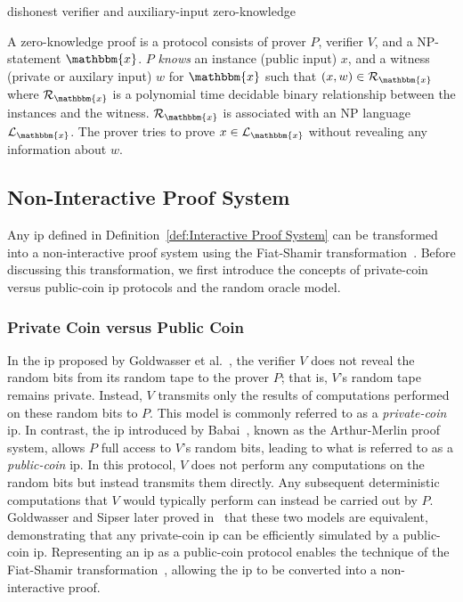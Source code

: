 dishonest verifier and auxiliary-input zero-knowledge

\begin{definition}
	\label{def:Zero-knowledge Proof}	
	A zero-knowledge proof is a protocol consists of prover $P$, verifier $V$, and a NP-statement $\mathbbm{x}$. $P$ \textit{knows} an instance (public input) $x$, and a witness (private or auxilary input) $w$ for $\mathbbm{x}$ such that $(x, w) \in \mathcal{R}_\mathbbm{x}$ where $\mathcal{R}_\mathbbm{x}$ is a polynomial time decidable binary relationship between the instances and the witness. $\mathcal{R}_\mathbbm{x}$ is associated with an NP language $\mathcal{L}_\mathbbm{x}$. The prover tries to prove $x \in \mathcal{L}_\mathbbm{x}$ without revealing any information about $w$.
	
\end{definition}


\subsection{Non-Interactive	Proof System}
Any \gls{ip} defined in Definition~\ref{def:Interactive Proof System} can be transformed into a non-interactive proof system using the Fiat-Shamir transformation~\cite{Fiat1987}. Before discussing this transformation, we first introduce the concepts of private-coin versus public-coin \gls{ip} protocols and the random oracle model.

\subsubsection{Private Coin versus Public Coin}
In the \gls{ip} proposed by Goldwasser et al.~\cite{Goldwasser1985}, the verifier \( V \) does not reveal the random bits from its random tape to the prover \( P \); that is, \( V \)'s random tape remains private. Instead, \( V \) transmits only the results of computations performed on these random bits to \( P \). This model is commonly referred to as a \textit{private-coin} \gls{ip}.  
In contrast, the \gls{ip} introduced by Babai~\cite{Babai85}, known as the Arthur-Merlin proof system, allows \( P \) full access to \( V \)'s random bits, leading to what is referred to as a \textit{public-coin} \gls{ip}. In this protocol, $V$ does not perform any computations on the random bits but instead transmits them directly. Any subsequent deterministic computations that $V$ would typically perform can instead be carried out by $P$.
Goldwasser and Sipser later proved in~\cite{Goldwasser1986Private_vs_Public} that these two models are equivalent, demonstrating that any private-coin \gls{ip} can be efficiently simulated by a public-coin \gls{ip}. Representing an \gls{ip} as a public-coin protocol enables the technique of the Fiat-Shamir transformation~\cite{Fiat1987}, allowing the \gls{ip} to be converted into a non-interactive proof.


